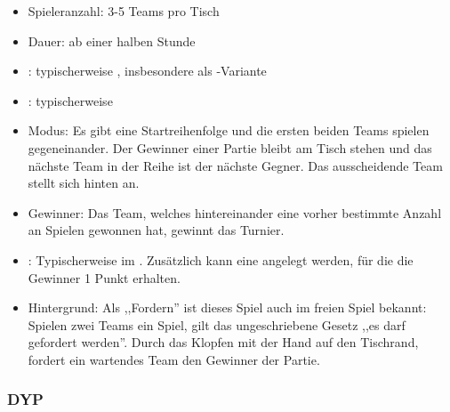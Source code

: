 \begin{itemize}
\item Spieleranzahl: 3-5 Teams pro Tisch
\item Dauer: ab einer halben Stunde
\item {}: typischerweise , insbesondere als -Variante
\item {}: typischerweise 
\item Modus: Es gibt eine Startreihenfolge und die ersten beiden Teams spielen gegeneinander. Der Gewinner einer Partie bleibt am Tisch stehen und das nächste Team in der Reihe ist der nächste Gegner. Das ausscheidende Team stellt sich hinten an. 
\item Gewinner: Das Team, welches hintereinander eine vorher bestimmte Anzahl an Spielen gewonnen hat, gewinnt das Turnier.  
\item {}:
Typischerweise im . Zusätzlich kann eine  angelegt werden, für die die Gewinner 1 Punkt erhalten. 
\item Hintergrund: Als ,,Fordern'' ist dieses Spiel auch im freien Spiel bekannt: Spielen zwei Teams ein Spiel, gilt das ungeschriebene Gesetz ,,es darf gefordert werden''. Durch das Klopfen mit der Hand auf den Tischrand, fordert ein wartendes Team den Gewinner der Partie. 
\end{itemize}


\subsubsection{DYP}
\label{turniere:vorbereitung:modus:dyp}

